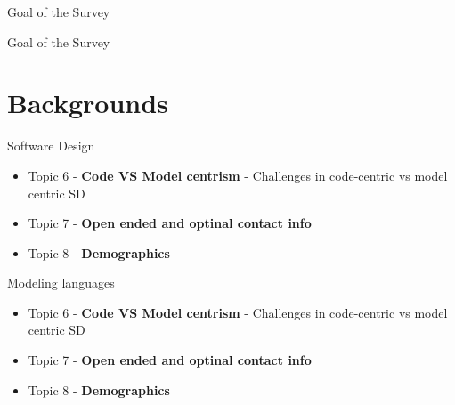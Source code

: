 \documentclass[slidetop,mathserif,red]{beamer}
\begin{document}
\begin{frame}{Goal of the Survey}
\end{frame}

\begin{frame}{Goal of the Survey}
\end{frame}



\section{Backgrounds}
\begin{frame}{Software Design}

\begin{itemize}

	\item Topic 6 -  \textbf{Code VS Model centrism} - Challenges in code-centric vs model centric SD
	\item Topic 7 -  \textbf{Open ended and optinal contact info} 
	\item Topic 8 -  \textbf{Demographics }
\end{itemize}

\end{frame}

\begin{frame}{Modeling languages}

\begin{itemize}
	
	\item Topic 6 -  \textbf{Code VS Model centrism} - Challenges in code-centric vs model centric SD
	\item Topic 7 -  \textbf{Open ended and optinal contact info} 
	\item Topic 8 -  \textbf{Demographics }
\end{itemize}

\end{frame}
\end{document}
